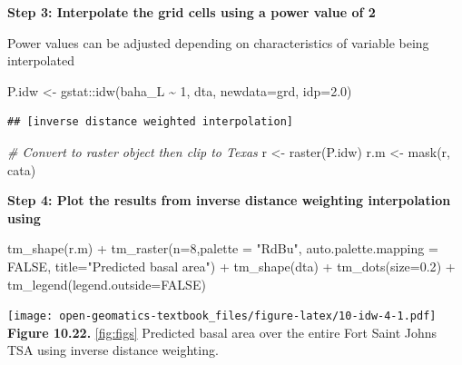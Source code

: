 \documentclass[
]{book}
\newenvironment{Shaded}{\begin{snugshade}}{\end{snugshade}}
\newcommand{\AttributeTok}[1]{\textcolor[rgb]{0.77,0.63,0.00}{#1}}
\newcommand{\CommentTok}[1]{\textcolor[rgb]{0.56,0.35,0.01}{\textit{#1}}}
\newcommand{\ConstantTok}[1]{\textcolor[rgb]{0.00,0.00,0.00}{#1}}
\newcommand{\DecValTok}[1]{\textcolor[rgb]{0.00,0.00,0.81}{#1}}
\newcommand{\FloatTok}[1]{\textcolor[rgb]{0.00,0.00,0.81}{#1}}
\newcommand{\FunctionTok}[1]{\textcolor[rgb]{0.00,0.00,0.00}{#1}}
\newcommand{\NormalTok}[1]{#1}
\newcommand{\OtherTok}[1]{\textcolor[rgb]{0.56,0.35,0.01}{#1}}
\newcommand{\SpecialCharTok}[1]{\textcolor[rgb]{0.00,0.00,0.00}{#1}}
\newcommand{\StringTok}[1]{\textcolor[rgb]{0.31,0.60,0.02}{#1}}
\begin{document}
\textbf{Step 3: Interpolate the grid cells using a power value of 2}

Power values can be adjusted depending on characteristics of variable being interpolated

\begin{Shaded}
\begin{Highlighting}[]
\NormalTok{P.idw }\OtherTok{\textless{}{-}}\NormalTok{ gstat}\SpecialCharTok{::}\FunctionTok{idw}\NormalTok{(baha\_L }\SpecialCharTok{\textasciitilde{}} \DecValTok{1}\NormalTok{, dta, }\AttributeTok{newdata=}\NormalTok{grd, }\AttributeTok{idp=}\FloatTok{2.0}\NormalTok{)}
\end{Highlighting}
\end{Shaded}

\begin{verbatim}
## [inverse distance weighted interpolation]
\end{verbatim}

\begin{Shaded}
\begin{Highlighting}[]
\CommentTok{\# Convert to raster object then clip to Texas}
\NormalTok{r       }\OtherTok{\textless{}{-}} \FunctionTok{raster}\NormalTok{(P.idw)}
\NormalTok{r.m     }\OtherTok{\textless{}{-}} \FunctionTok{mask}\NormalTok{(r, cata)}
\end{Highlighting}
\end{Shaded}

\textbf{Step 4: Plot the results from inverse distance weighting interpolation using}

\begin{Shaded}
\begin{Highlighting}[]
\FunctionTok{tm\_shape}\NormalTok{(r.m) }\SpecialCharTok{+} 
  \FunctionTok{tm\_raster}\NormalTok{(}\AttributeTok{n=}\DecValTok{8}\NormalTok{,}\AttributeTok{palette =} \StringTok{"RdBu"}\NormalTok{, }\AttributeTok{auto.palette.mapping =} \ConstantTok{FALSE}\NormalTok{,}
            \AttributeTok{title=}\StringTok{"Predicted basal area"}\NormalTok{) }\SpecialCharTok{+} 
  \FunctionTok{tm\_shape}\NormalTok{(dta) }\SpecialCharTok{+} \FunctionTok{tm\_dots}\NormalTok{(}\AttributeTok{size=}\FloatTok{0.2}\NormalTok{) }\SpecialCharTok{+}
  \FunctionTok{tm\_legend}\NormalTok{(}\AttributeTok{legend.outside=}\ConstantTok{FALSE}\NormalTok{)}
\end{Highlighting}
\end{Shaded}

\texttt{[image: open-geomatics-textbook\_files/figure-latex/10-idw-4-1.pdf]}
\textbf{Figure 10.22.} \ref{fig:figs} Predicted basal area over the entire Fort Saint Johns TSA using inverse distance weighting.
\end{document}
